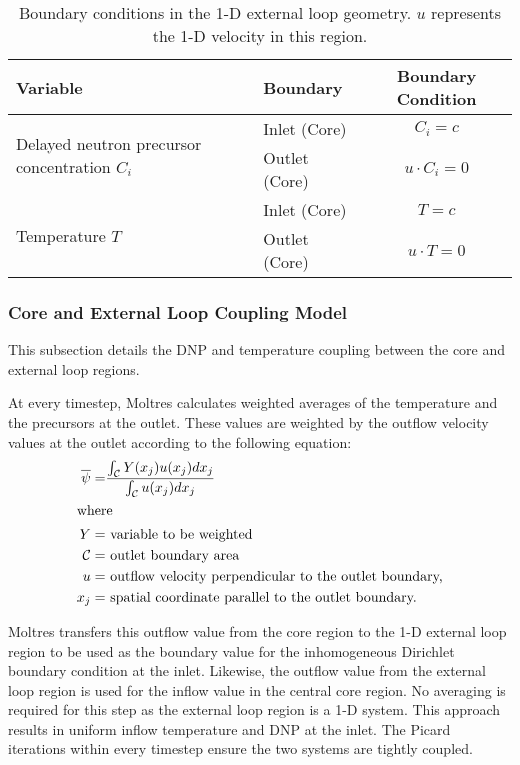 \begin{table}[htbp!]
    \small
	\caption{Boundary conditions in the 1-D external loop geometry. $u$
	represents the 1-D velocity in this region.}
	\centering
	\begin{tabular}{ l l c}
		\toprule
		Variable & Boundary & Boundary Condition \\
        \midrule
        \multirow{2}{*}{Delayed neutron precursor concentration $C_i$} &
        Inlet (Core) & $C_i = c$ \\
        & Outlet (Core) & $u \cdot C_i = 0$ \\
        \midrule
        \multirow{2}{*}{Temperature $T$} &
        Inlet (Core) & $T = c$ \\
        & Outlet (Core) & $u \cdot T = 0$ \\
		\bottomrule
	\end{tabular}
	\label{table:loopbc}
\end{table}

\subsubsection{Core and External Loop Coupling Model}

This subsection details the \gls{DNP} and
temperature coupling between the core and external loop regions. 

At every timestep, Moltres calculates weighted averages of the
temperature and the precursors at the outlet. These values are weighted by the
outflow velocity values at the outlet according to the following equation:
%
\begin{align}
    \overline{\psi} =& \frac{\int_\mathcal{C} Y(x_j) u(x_j) dx_j}{
    \int_\mathcal{C} u(x_j) dx_j} \\
    \shortintertext{where}
    Y =& \text{ variable to be weighted} \nonumber \\
    \mathcal{C} =& \text{ outlet boundary area} \nonumber \\
    u =& \text{ outflow velocity perpendicular to the outlet boundary,} \nonumber \\
    x_j =& \text{ spatial coordinate parallel to the outlet boundary.}
    \nonumber
\end{align}

Moltres transfers this outflow value from the core region to the 1-D
external loop region to be used as the boundary value for the inhomogeneous
Dirichlet boundary
condition at the inlet. Likewise, the outflow value from the external
loop region is used for the inflow value in the central core region. No
averaging is required for this step as the external loop region is a 1-D system.
This approach results in uniform inflow temperature and \gls{DNP} at the
inlet. The Picard iterations within every timestep ensure the two systems
are tightly coupled.

